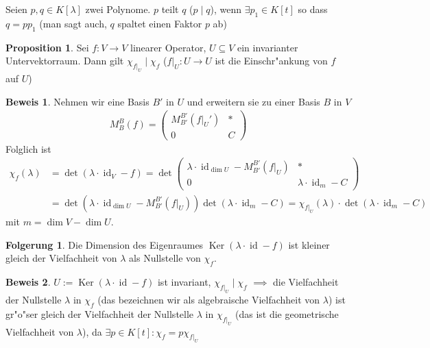 \documentclass[oneside,fontsize=11pt,paper=a4,BCOR=0mm,DIV=12,automark,headsepline]{scrbook}
\DeclareMathOperator{\mKer}{Ker}
\DeclareMathOperator{\mId}{id}
\theoremstyle{remark}
\theoremstyle{definition}
\newtheorem{folgerung}{Folgerung}
\newtheorem*{proposition}{Proposition}
\theoremstyle{definition}
\newtheorem*{prof}{Beweis}
\theoremstyle{remark}
\begin{document}
\begin{definition}{}{}
  Seien $p,q\in K[\lambda]$ zwei Polynome. $p$ teilt $q$ ($p\mid q$), wenn \(\exists p_1 \in K[t]\) so dass \(q = pp_1\)
  (man sagt auch, \(q\) spaltet einen Faktor \(p\) ab)
\end{definition}

\begin{proposition}
  Sei \(f: V\to V\) linearer Operator, $U\subseteq V$ ein invarianter Untervektorraum. Dann gilt \(\chi_{f|_U} \mid \chi_f\) (\(f|_U:U\to U\) ist die Einschr"ankung von \(f\) auf \(U\))
\end{proposition}
\begin{prof}
  Nehmen wir eine Basis $B'$ in $U$ und erweitern sie zu einer Basis $B$ in $V$
  \begin{align*}
    M^B_B(f) =
    \begin{pmatrix}
      M^{B'}_{B'}(f|_U') & * \\
      0 & C
    \end{pmatrix}
  \end{align*}
  Folglich ist
  \begin{align*}
    \chi_f(\lambda) &= \det(\lambda\cdot\mId_V - f) = \det
    \begin{pmatrix}
      \lambda\cdot\mId_{\dim U} - M^{B'}_{B'}(f|_U) & *\\
      0 & \lambda\cdot\mId_m - C
    \end{pmatrix}\\
    &= \det(\lambda\cdot\mId_{\dim U} - M^{B'}_{B'}(f|_U))\det(\lambda\cdot\mId_m  - C) = \chi_{f|_U}(\lambda)\cdot\det(\lambda\cdot\mId_m - C)
  \end{align*}
  mit \(m = \dim V - \dim U\).
\end{prof}

\begin{folgerung}
  Die Dimension des Eigenraumes \(\mKer(\lambda\cdot\mId - f)\) ist kleiner gleich der Vielfachheit von \(\lambda\) als Nullstelle von \(\chi_f\).
\end{folgerung}

\begin{prof}
  \(U:= \mKer(\lambda\cdot\mId - f)\) ist invariant,
  \(\chi_{f|_U} \mid \chi_f\) \(\implies\) die Vielfachheit der Nullstelle \(\lambda\) in \(\chi_f\) (das bezeichnen wir als \glqq{}algebraische\grqq{} Vielfachheit von \(\lambda\)) ist gr"o"ser gleich der Vielfachheit der Nullstelle \(\lambda\) in \(\chi_{f|_U}\) (das ist die \glqq{}geometrische\grqq{} Vielfachheit von \(\lambda\)), da \(\exists p\in K[t]: \chi_f = p\chi_{f|_U}\)
\end{prof}
\end{document}
